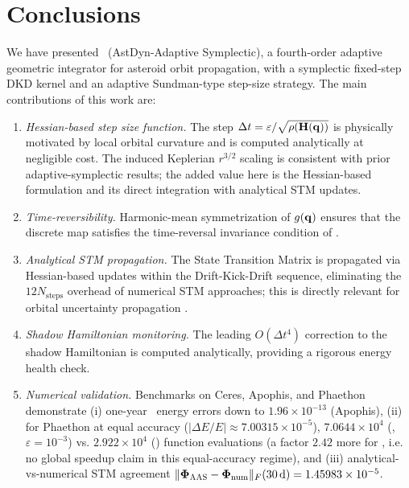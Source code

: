 
\section{Conclusions}
\label{sec:conclusions}

We have presented \AAS\ (AstDyn-Adaptive Symplectic), a fourth-order
adaptive geometric integrator for asteroid orbit propagation,
with a symplectic fixed-step DKD kernel and an adaptive
Sundman-type step-size strategy.
The main contributions of this work are:

\begin{enumerate}

  \item \textit{Hessian-based step size function.}
    The step $\Delta t = \varepsilon / \sqrt{\rho(\mathbf{H}(\mathbf{q}))}$
    is physically motivated by local orbital curvature and is computed
    analytically at negligible cost. The induced Keplerian
    $r^{3/2}$ scaling is consistent with prior adaptive-symplectic
    results; the added value here is the Hessian-based formulation and
    its direct integration with analytical STM updates.

  \item \textit{Time-reversibility.}
    Harmonic-mean symmetrization of $g(\mathbf{q})$ ensures that the
    discrete map satisfies the time-reversal invariance condition
    of \citet{PretoTremaine1999}.

  \item \textit{Analytical STM propagation.}
    The State Transition Matrix is propagated via Hessian-based
    updates within the Drift-Kick-Drift sequence, eliminating the
    $12N_{\mathrm{steps}}$ overhead of numerical STM approaches;
    this is directly relevant for orbital uncertainty propagation
    \citep{Zhou2024dstt}.

  \item \textit{Shadow Hamiltonian monitoring.}
    The leading $O(\Delta t^4)$ correction to the shadow Hamiltonian
    is computed analytically, providing a rigorous energy health check.

  \item \textit{Numerical validation.}
    Benchmarks on Ceres, Apophis, and Phaethon demonstrate
    (i) one-year \AAS\ energy errors down to
    $1.96\times10^{-13}$ (Apophis),
    (ii) for Phaethon at equal accuracy
    ($|\Delta E/E|\approx7.00315\times10^{-5}$),
    $7.0644\times10^4$ (\AAS, $\varepsilon=10^{-3}$)
    vs.
    $2.922\times10^4$ (\saba) function evaluations
    (a factor $2.42$ more for \AAS, i.e.
    no global speedup claim in this equal-accuracy regime), and
    (iii) analytical-vs-numerical STM agreement
    $\|\boldsymbol{\Phi}_{\textsc{AAS}}-\boldsymbol{\Phi}_{\mathrm{num}}\|_F(30\,\mathrm{d})
    =1.45983\times10^{-5}$.

\end{enumerate}

